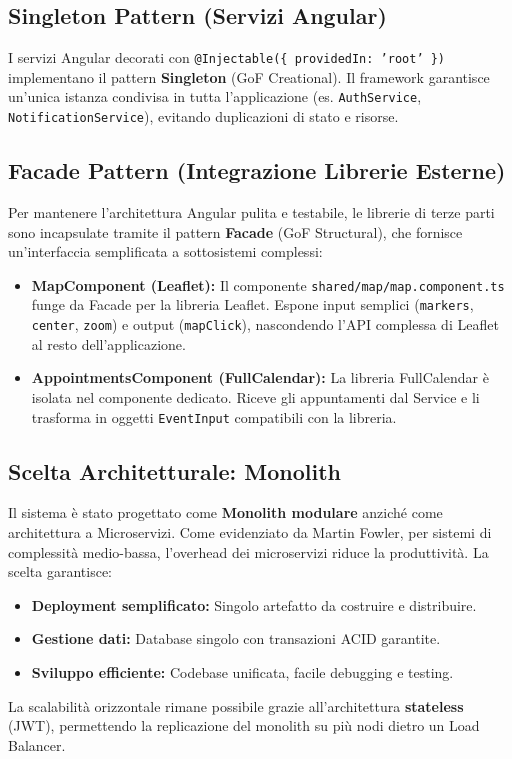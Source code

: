 \subsection{Singleton Pattern (Servizi Angular)}
I servizi Angular decorati con \texttt{@Injectable(\{ providedIn: 'root' \})} implementano 
il pattern \textbf{Singleton} (GoF Creational). Il framework garantisce un'unica istanza 
condivisa in tutta l'applicazione (es. \texttt{AuthService}, \texttt{NotificationService}), 
evitando duplicazioni di stato e risorse.

\subsection{Facade Pattern (Integrazione Librerie Esterne)}
Per mantenere l'architettura Angular pulita e testabile, le librerie di terze parti 
sono incapsulate tramite il pattern \textbf{Facade} (GoF Structural), che fornisce 
un'interfaccia semplificata a sottosistemi complessi:
\begin{itemize}
    \item \textbf{MapComponent (Leaflet):} Il componente \texttt{shared/map/map.component.ts} 
    funge da Facade per la libreria Leaflet. Espone input semplici (\texttt{markers}, 
    \texttt{center}, \texttt{zoom}) e output (\texttt{mapClick}), nascondendo l'API 
    complessa di Leaflet al resto dell'applicazione.
    \item \textbf{AppointmentsComponent (FullCalendar):} La libreria FullCalendar è 
    isolata nel componente dedicato. Riceve gli appuntamenti dal Service e li trasforma 
    in oggetti \texttt{EventInput} compatibili con la libreria.
\end{itemize}

\subsection{Scelta Architetturale: Monolith}
Il sistema è stato progettato come \textbf{Monolith modulare} anziché come architettura 
a Microservizi. Come evidenziato da Martin Fowler, per sistemi di complessità medio-bassa, 
l'overhead dei microservizi riduce la produttività. La scelta garantisce:
\begin{itemize}
    \item \textbf{Deployment semplificato:} Singolo artefatto da costruire e distribuire.
    \item \textbf{Gestione dati:} Database singolo con transazioni ACID garantite.
    \item \textbf{Sviluppo efficiente:} Codebase unificata, facile debugging e testing.
\end{itemize}
La scalabilità orizzontale rimane possibile grazie all'architettura \textbf{stateless} (JWT), 
permettendo la replicazione del monolith su più nodi dietro un Load Balancer.


